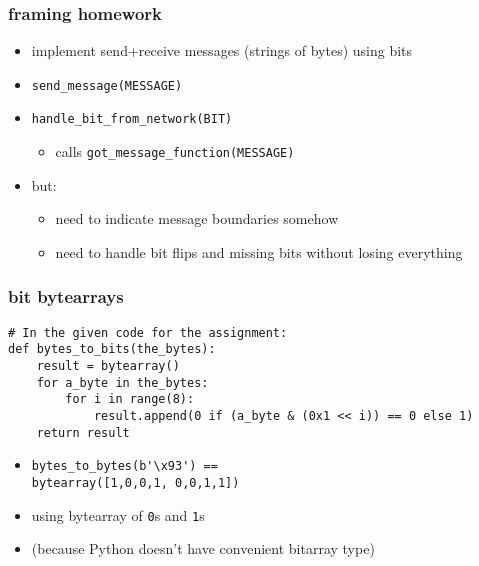 \begin{frame}\frametitle{framing homework}
    \begin{itemize}
    \item implement send+receive messages (strings of bytes) using bits
    \item \texttt{send\_message(MESSAGE)}
    \item \texttt{handle\_bit\_from\_network(BIT)}
        \begin{itemize}
        \item calls \texttt{got\_message\_function(MESSAGE)}
        \end{itemize}
    \vspace{.5cm}
    \item but:
        \begin{itemize}
        \item need to indicate message boundaries somehow
        \item need to handle bit flips and missing bits without losing everything
        \end{itemize}
    \end{itemize}
\end{frame}

\begin{FragileFrame}
\frametitle{bit bytearrays}
\begin{Verbatim}[fontsize=\fontsize{9}{10}]
# In the given code for the assignment:
def bytes_to_bits(the_bytes):
    result = bytearray()
    for a_byte in the_bytes:
        for i in range(8):
            result.append(0 if (a_byte & (0x1 << i)) == 0 else 1)
    return result
\end{Verbatim}
\begin{itemize}
    \item \verb|bytes_to_bytes(b'\x93') == | \\
            \verb|bytearray([1,0,0,1, 0,0,1,1])|
    \item using bytearray of \texttt{0}s and \texttt{1}s
    \item (because Python doesn't have convenient bitarray type)
\end{itemize}
\end{FragileFrame}
